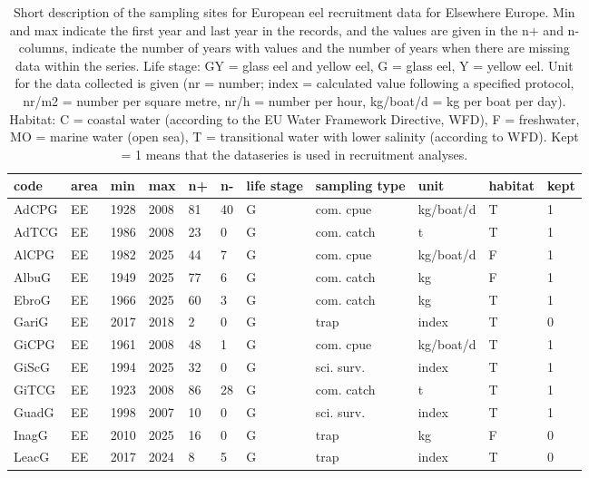 \begin{table}[ht]
\centering
\caption{Short description of the sampling sites for European eel recruitment data for Elsewhere Europe. Min and max indicate the first year and last year in the records, and the values are given in the n+ and n- columns, indicate the number of years with values and the number of years when there are missing data within the series. Life stage: GY = glass eel and yellow eel, G = glass eel, Y = yellow eel. Unit for the data collected is given (nr = number; index = calculated value following a specified protocol, nr/m2 = number per square metre, nr/h = number per hour, kg/boat/d = kg per boat per day). Habitat: C = coastal water (according to the EU Water Framework Directive, WFD), F = freshwater, MO = marine water (open sea), T = transitional water with lower salinity (according to WFD). Kept = 1 means that the dataseries is used in recruitment analyses.} 
\label{statseriesG}
\begin{tabular}{p{1cm}p{1cm}p{1cm}p{1cm}p{0.8cm}p{0.8cm}p{1cm}p{2cm}p{2cm}p{1cm}p{1cm}}
  \hline
code & area & min & max & n+ & n- & life stage & sampling type & unit & habitat & kept \\ 
  \hline
AdCPG & EE & 1928 & 2008 & 81 & 40 & G & com. cpue & kg/boat/d & T & 1 \\ 
  AdTCG & EE & 1986 & 2008 & 23 & 0 & G & com. catch & t & T & 1 \\ 
  AlCPG & EE & 1982 & 2025 & 44 & 7 & G & com. cpue & kg/boat/d & F & 1 \\ 
  AlbuG & EE & 1949 & 2025 & 77 & 6 & G & com. catch & kg & F & 1 \\ 
  EbroG & EE & 1966 & 2025 & 60 & 3 & G & com. catch & kg & T & 1 \\ 
  GariG & EE & 2017 & 2018 & 2 & 0 & G & trap & index & T & 0 \\ 
  GiCPG & EE & 1961 & 2008 & 48 & 1 & G & com. cpue & kg/boat/d & T & 1 \\ 
  GiScG & EE & 1994 & 2025 & 32 & 0 & G & sci. surv. & index & T & 1 \\ 
  GiTCG & EE & 1923 & 2008 & 86 & 28 & G & com. catch & t & T & 1 \\ 
  GuadG & EE & 1998 & 2007 & 10 & 0 & G & sci. surv. & index & T & 1 \\ 
  InagG & EE & 2010 & 2025 & 16 & 0 & G & trap & kg & F & 0 \\ 
  LeacG & EE & 2017 & 2024 & 8 & 5 & G & trap & index & T & 0 \\ 

\end{tabular}
\end{table}
